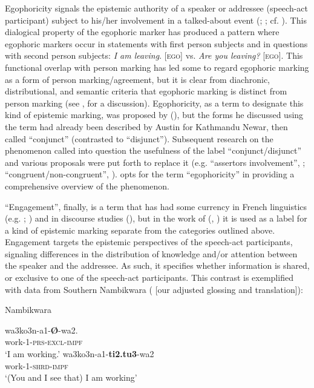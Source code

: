 \documentclass[output=paper]{langsci/langscibook}
\begin{document}
Egophoricity signals the epistemic authority of a speaker or addressee (speech-act participant) subject to his/her involvement in a talked-about event (\citealt{Bergqvist2018b}; \citealt{BergqvistKittila2017}; cf. \citealt{Hargreaves2005}). This dialogical property of the egophoric marker has produced a pattern where egophoric markers occur in statements with first person subjects and in questions with second person subjects: \textit{I am leaving}. [\textsc{ego}] vs. \textit{Are you leaving?} [\textsc{ego}]. This functional overlap with person marking has led some to regard egophoric marking as a form of person marking/agreement, but it is clear from diachronic, distributional, and semantic criteria that egophoric marking is distinct from person marking (see \citealt{BergqvistKittila2017}, for a discussion). Egophoricity, as a term to designate this kind of epistemic marking, was proposed by \citeauthor{Tournadre1996} (\citeyear[201]{Tournadre1996}), but the forms he discussed using the term had already been described by Austin \cite{Hale1980} for Kathmandu Newar, then called “conjunct” (contrasted to “disjunct”). Subsequent research on the phenomenon called into question the usefulness of the label “conjunct/disjunct” and various proposals were put forth to replace it (e.g. “assertors involvement”, \citealt{Creissels2008}; “congruent/non-congruent”, \citealt{Dickinson2000}). \cite{SanRoqueetal2018} opts for the term ``egophoricity'' in providing a comprehensive overview of the phenomenon.

``Engagement'', finally, is a term that has had some currency in French linguistics (e.g. \citealt{Descles2009}; \citealt{Guentcheva2011}) and in discourse studies (\citealt{Hyland2005}), but in the work of \citeauthor{Evansetal2017a} (\citeyear{Evansetal2017a}, \citeyear{Evansetal2017b}) it is used as a label for a kind of epistemic marking separate from the categories outlined above. Engagement targets the epistemic perspectives of the speech-act participants, signaling differences in the distribution of knowledge and/or attention between the speaker and the addressee. As such, it specifies whether information is shared, or exclusive to one of the speech-act participants. This contrast is exemplified with data from Southern Nambikwara (\citealt[63--64]{Kroeker2001} [our adjusted glossing and translation]):

\begin{exe}
\ex Nambikwara \label{ex:hb1}
	\begin{xlist}
	\ex 
	\gll wa3ko3n-a1-\textbf{Ø}-wa2.\\
	work-1-\textsc{prs}-\textsc{excl}-\textsc{impf}\\
	\trans ‘I am working.’ 
	\ex 
	\gll wa3ko3n-a1-\textbf{ti2.tu3}-wa2\\
	work-1-\textsc{shrd}-\textsc{impf}\\
	\trans ‘(You and I see that) I am working’ 	
	\end{xlist}
\end{exe}
\end{document}
